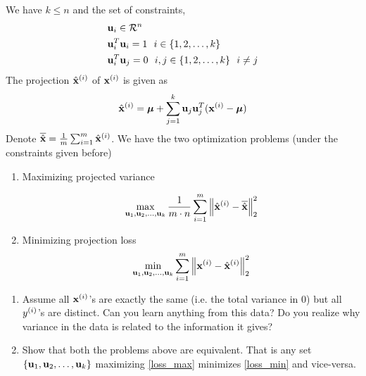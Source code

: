 We have $k \leq n$ and the set of constraints, 
\begin{align}
    &\mathbf{u}_i \in \mathcal{R}^n\label{constraints_start}\\
    &\mathbf{u}_i^T\mathbf{u}_i = 1 \ \  i \in \{1, 2, \dots, k\}\\
    &\mathbf{u}_i^T\mathbf{u}_j = 0 \ \  i, j \in \{1, 2, \dots, k\} \ \  i \neq j\label{constraints_end}
\end{align}
The projection $\hat{\mathbf{x}}^{(i)}$ of $\mathbf{x}^{(i)}$ is given as 
\begin{equation*}
    \hat{\mathbf{x}}^{(i)} = \boldsymbol{\mu} + \sum_{j = 1}^{k} \mathbf{u}_j\mathbf{u}_j^T(\mathbf{x}^{(i)} - \boldsymbol{\mu})
\end{equation*}
Denote $\overline{\hat{\mathbf{x}}} = \frac{1}{m}\sum_{i = 1}^{m} \hat{\mathbf{x}}^{(i)}$. We have the two optimization problems (under the constraints given before)
\begin{enumerate}
\item  Maximizing projected variance

\begin{equation}\label{loss_max}
    \max\limits_{\mathbf{u}_1, \mathbf{u}_2,\dots, \mathbf{u}_k} \frac{1}{m \cdot n} \sum_{i = 1}^{m} \left\lVert\hat{\mathbf{x}}^{(i)} - \overline{\hat{\mathbf{x}}}\right\rVert_2^2\end{equation}
\item Minimizing projection loss
\begin{equation}\label{loss_min}
\min\limits_{\mathbf{u}_1, \mathbf{u}_2,\dots, \mathbf{u}_k} \sum_{i = 1}^{m}\left\lVert\mathbf{x}^{(i)} - \hat{\mathbf{x}}^{(i)}\right\rVert_2^2\end{equation}
\end{enumerate}
\begin{enumerate}[label=\alph*)]
    \item Assume all $\mathbf{x}^{(i)}$'s are exactly the same (i.e. the total variance in $0$) but all $y^{(i)}$'s are distinct. Can you learn anything from this data? Do you realize why variance in the data is related to the information it gives? 
    \item Show that both the problems above are equivalent. That is any set $\{\mathbf{u}_1, \mathbf{u}_2,\dots, \mathbf{u}_k\}$ maximizing \autoref{loss_max} minimizes \autoref{loss_min} and vice-versa.
\end{enumerate}
